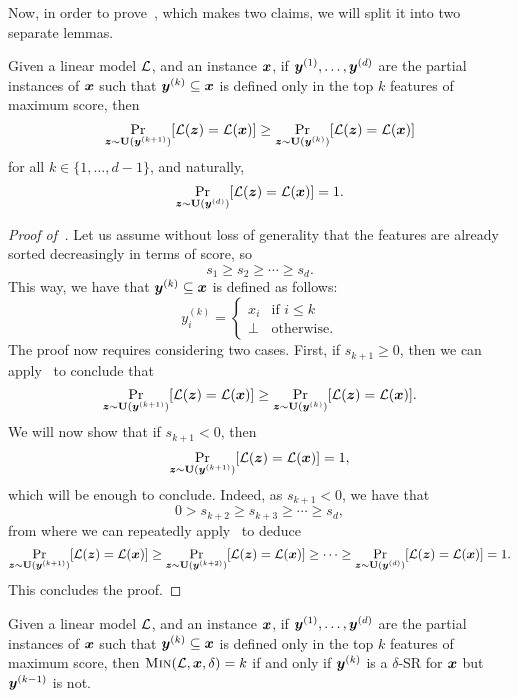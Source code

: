 Now, in order to prove~, which makes two claims, we will split it into two separate lemmas. 
\begin{claim}\label{lemma:greedy-1}
    Given a linear model $\mathcal{L}$, and an instance ${\bm{x}}$, if ${\bm{y}}^{(1)}, \ldots, {\bm{y}}^{(d)}$ are the partial instances of ${\bm{x}}$ such that ${\bm{y}}^{(k)} \subseteq {\bm{x}}$ is defined only in the top $k$ features of maximum score, then
    \[ 
        \Pr_{{\bm{z}} \sim \mathbf{U}({\bm{y}}^{(k+1)})}[\mathcal{L}({\bm{z}}) = \mathcal{L}({\bm{x}})] \geq \Pr_{{\bm{z}} \sim \mathbf{U}({\bm{y}}^{(k)})}[\mathcal{L}({\bm{z}}) = \mathcal{L}({\bm{x}})]
    \]
    for all $k \in \{1, \ldots, d-1\}$, and naturally, 
    \[ 
    \Pr_{{\bm{z}} \sim \mathbf{U}({\bm{y}}^{(d)})}[\mathcal{L}({\bm{z}}) = \mathcal{L}({\bm{x}})] = 1.
    \]
\end{claim}
\begin{proof}[Proof of~]
Let us assume without loss of generality that the features are already sorted decreasingly in terms of score, so \[s_1 \geq s_2 \geq \cdots \geq s_d.\]
This way, we have that ${\bm{y}}^{(k)} \subseteq {\bm{x}}$ is defined as follows:
\[ 
    y^{(k)}_i = \begin{cases}
        x_i & \text{if } i \leq k\\
        \bot & \text{otherwise}.
    \end{cases}
\]
The proof now requires considering two cases. First, if $s_{k+1} \geq 0$, then we can apply~ to conclude that
\[ 
    \Pr_{{\bm{z}} \sim \mathbf{U}({\bm{y}}^{(k+1)})}[\mathcal{L}({\bm{z}}) = \mathcal{L}({\bm{x}})] \geq \Pr_{{\bm{z}} \sim \mathbf{U}({\bm{y}}^{(k)})}[\mathcal{L}({\bm{z}}) = \mathcal{L}({\bm{x}})].
\]
We will now show that if $s_{k+1} < 0$, then 
\[ 
    \Pr_{{\bm{z}} \sim \mathbf{U}({\bm{y}}^{(k+1)})}[\mathcal{L}({\bm{z}}) = \mathcal{L}({\bm{x}})] = 1,
\]
which will be enough to conclude. Indeed, as $s_{k+1} < 0$, we have that 
\[
   0 > s_{k+2} \geq s_{k+3} \geq \cdots \geq s_d, 
\]
from where we can repeatedly apply~ to deduce 
\[ 
    \Pr_{{\bm{z}} \sim \mathbf{U}({\bm{y}}^{(k+1)})}[\mathcal{L}({\bm{z}}) = \mathcal{L}({\bm{x}})]  \geq \Pr_{{\bm{z}} \sim \mathbf{U}({\bm{y}}^{(k+2)})}[\mathcal{L}({\bm{z}}) = \mathcal{L}({\bm{x}})] \geq \cdots \geq \Pr_{{\bm{z}} \sim \mathbf{U}({\bm{y}}^{(d)})}[\mathcal{L}({\bm{z}}) = \mathcal{L}({\bm{x}})] = 1.
\]
This concludes the proof.
\end{proof}
\begin{claim}\label{lemma:greedy-2}
    Given a linear model $\mathcal{L}$, and an instance ${\bm{x}}$, if ${\bm{y}}^{(1)}, \ldots, {\bm{y}}^{(d)}$ are the partial instances of ${\bm{x}}$ such that ${\bm{y}}^{(k)} \subseteq {\bm{x}}$ is defined only in the top $k$ features of maximum score, then $\operatorname{\textsc{Min}}(\mathcal{L}, {\bm{x}}, \delta) = k$ if and only if ${\bm{y}}^{(k)}$ is a $\delta$-SR for ${\bm{x}}$ but ${\bm{y}}^{(k-1)}$ is not. 
\end{claim}

